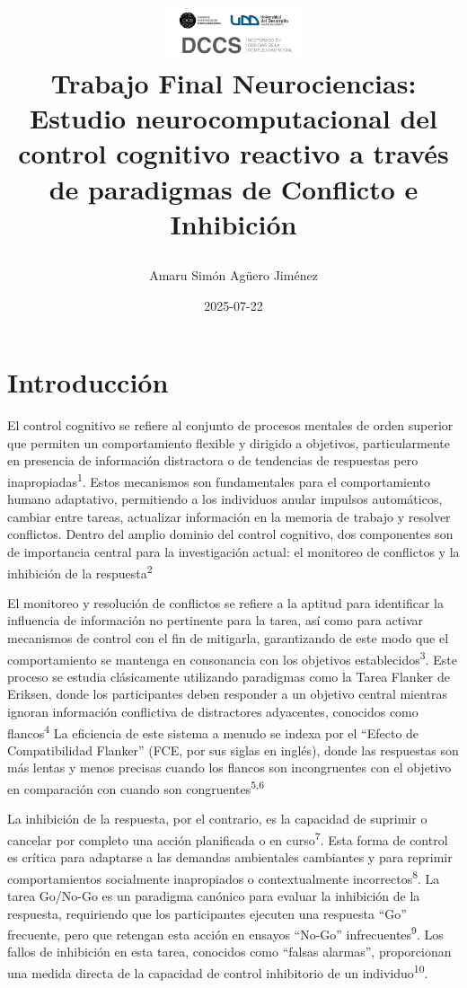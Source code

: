 \documentclass[
  spanish,
  10pt,
]{article}
\title{\begin{center}
  \includegraphics[height=1.5cm]{logo2.png} \\[1cm]
  \Large Trabajo Final Neurociencias: \\ Estudio neurocomputacional del control cognitivo reactivo a través de paradigmas de Conflicto e Inhibición
\end{center}}
\author{Amaru Simón Agüero Jiménez}
\date{2025-07-22}
\renewcommand*\contentsname{Tabla de contenidos}
\newcommand\contentsname{Tabla de contenidos}
\begin{document}
\maketitle

\renewcommand*\contentsname{Tabla de contenidos}
{
\hypersetup{linkcolor=}
\setcounter{tocdepth}{3}
\tableofcontents
}

\newpage

\section{Introducción}\label{introducciuxf3n}

El control cognitivo se refiere al conjunto de procesos mentales de
orden superior que permiten un comportamiento flexible y dirigido a
objetivos, particularmente en presencia de información distractora o de
tendencias de respuestas pero inapropiadas\textsuperscript{1}. Estos
mecanismos son fundamentales para el comportamiento humano adaptativo,
permitiendo a los individuos anular impulsos automáticos, cambiar entre
tareas, actualizar información en la memoria de trabajo y resolver
conflictos. Dentro del amplio dominio del control cognitivo, dos
componentes son de importancia central para la investigación actual: el
monitoreo de conflictos y la inhibición de la
respuesta\textsuperscript{2}

El monitoreo y resolución de conflictos se refiere a la aptitud para
identificar la influencia de información no pertinente para la tarea,
así como para activar mecanismos de control con el fin de mitigarla,
garantizando de este modo que el comportamiento se mantenga en
consonancia con los objetivos establecidos\textsuperscript{3}. Este
proceso se estudia clásicamente utilizando paradigmas como la Tarea
Flanker de Eriksen, donde los participantes deben responder a un
objetivo central mientras ignoran información conflictiva de
distractores adyacentes, conocidos como flancos\textsuperscript{4} La
eficiencia de este sistema a menudo se indexa por el ``Efecto de
Compatibilidad Flanker'' (FCE, por sus siglas en inglés), donde las
respuestas son más lentas y menos precisas cuando los flancos son
incongruentes con el objetivo en comparación con cuando son
congruentes\textsuperscript{5,6}

La inhibición de la respuesta, por el contrario, es la capacidad de
suprimir o cancelar por completo una acción planificada o en
curso\textsuperscript{7}. Esta forma de control es crítica para
adaptarse a las demandas ambientales cambiantes y para reprimir
comportamientos socialmente inapropiados o contextualmente
incorrectos\textsuperscript{8}. La tarea Go/No-Go es un paradigma
canónico para evaluar la inhibición de la respuesta, requiriendo que los
participantes ejecuten una respuesta ``Go'' frecuente, pero que retengan
esta acción en ensayos ``No-Go'' infrecuentes\textsuperscript{9}. Los
fallos de inhibición en esta tarea, conocidos como ``falsas alarmas'',
proporcionan una medida directa de la capacidad de control inhibitorio
de un individuo\textsuperscript{10}.
\end{document}

